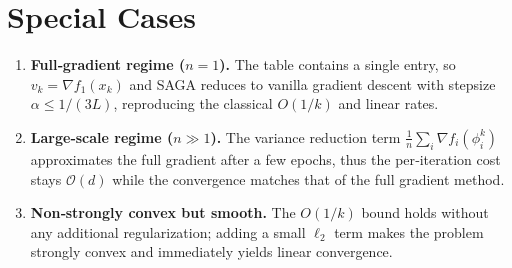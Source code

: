 \documentclass{article}
\newcommand{\grad}{\nabla}
\begin{document}
\section*{Special Cases}
\begin{enumerate}
\item \textbf{Full‑gradient regime ($n=1$).} The table contains a single entry,
so $v_k=\grad f_1(x_k)$ and SAGA reduces to vanilla gradient descent with
stepsize $\alpha\le 1/(3L)$, reproducing the classical $O(1/k)$ and linear
rates.
\item \textbf{Large‑scale regime ($n\gg 1$).} The variance reduction term
$\frac{1}{n}\sum_i\grad f_i(\phi_i^k)$ approximates the full gradient after a
few epochs, thus the per‑iteration cost stays $\mathcal{O}(d)$ while the
convergence matches that of the full gradient method.
\item \textbf{Non‑strongly convex but smooth.} The $O(1/k)$ bound holds without
any additional regularization; adding a small $\ell_2$ term makes the problem
strongly convex and immediately yields linear convergence.
\end{enumerate}
\end{document}
